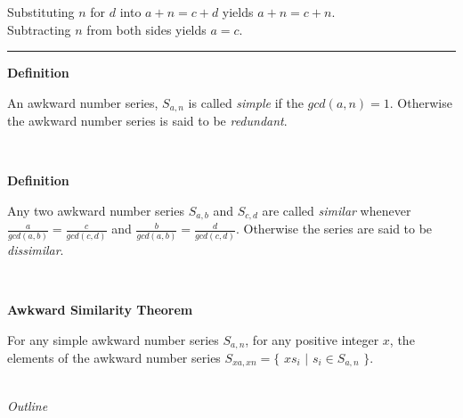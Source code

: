 \documentclass[a4paper,12pt]{article}
\begin{document}
\noindent Substituting $n$ for $d$ into $a + n = c + d$ yields $a + n = c + n$.\\

\noindent Subtracting $n$ from both sides yields $a = c$.

\begin{center}
\noindent\rule{8cm}{0.4pt}
\end{center}










\label{definition:simple_and_redundant_series}
\hypertarget{definition:simple_and_redundant_series}{}
\begin{tcolorbox}
\textbf{Definition}

An awkward number series, $S_{a,n}$ is called \textit{simple} if the $gcd(a,n) = 1$. Otherwise the awkward number series is said to be \textit{redundant}.

\end{tcolorbox}
\noindent \\









\label{definition:similar_series}
\hypertarget{definition:similar_series}{}
\begin{tcolorbox}
\textbf{Definition}

Any two awkward number series $S_{a,b}$ and $S_{c,d}$ are called \textit{similar} whenever $\frac{a}{gcd(a,b)} = \frac{c}{gcd(c,d)}$ and $\frac{b}{gcd(a,b)} = \frac{d}{gcd(c,d)}$. Otherwise the series are said to be \textit{dissimilar}.

\end{tcolorbox}
\noindent \\







\label{theorem:similar_theorem}
\hypertarget{theorem:similar_theorem}{}
\begin{tcolorbox}
\textbf{Awkward Similarity Theorem}

\noindent For any simple awkward number series $S_{a, n}$, for any positive integer $x$, the elements of the awkward number series $S_{xa, xn} = \{$ $xs_i$ $|$ $s_i \in S_{a,n}$ $\}$.
\end{tcolorbox}

\noindent \\
\textit{Outline}
\end{document}
